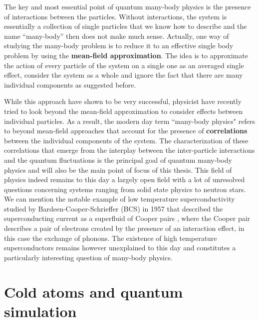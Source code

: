 The key and most essential point of quantum many-body physics is the presence of interactions between the particles. Without interactions, the system is essentially a collection of single particles that we know how to describe and the name ``many-body'' then does not make much sense. Actually, one way of studying the many-body problem is to reduce it to an effective single body problem by using the \textbf{mean-field approximation}. The idea is to approximate the action of every particle of the system on a single one as an averaged single effect, \ie consider the system as a whole and ignore the fact that there are many individual components as suggested before.

While this approach have shown to be very successful, physicist have recently tried to look beyond the mean-field approximation to consider effects between individual particles. As a result, the modern day term ``many-body physics" refers to beyond mean-field approaches that account for the presence of \textbf{correlations} between the individual components of the system. The characterization of these correlations that emerge from the interplay between the inter-particle interactions and the quantum fluctuations is the principal goal of quantum many-body physics and will also be the main point of focus of this thesis. This field of physics indeed remains to this day a largely open field with a lot of unresolved questions concerning systems ranging from solid state physics to neutron stars. We can mention the notable example of low temperature superconductivity studied by Bardeen-Cooper-Schrieffer \cite{bardeen1957theory} (BCS) in 1957 that described the superconducting current as a superfluid of Cooper pairs \cite{cooper1956bound}, where the Cooper pair describes a pair of electrons created by the presence of an interaction effect, in this case the exchange of phonons. The existence of high temperature superconductors remains however unexplained to this day and constitutes a particularly interesting question of many-body physics.

\section*{Cold atoms and quantum simulation}

